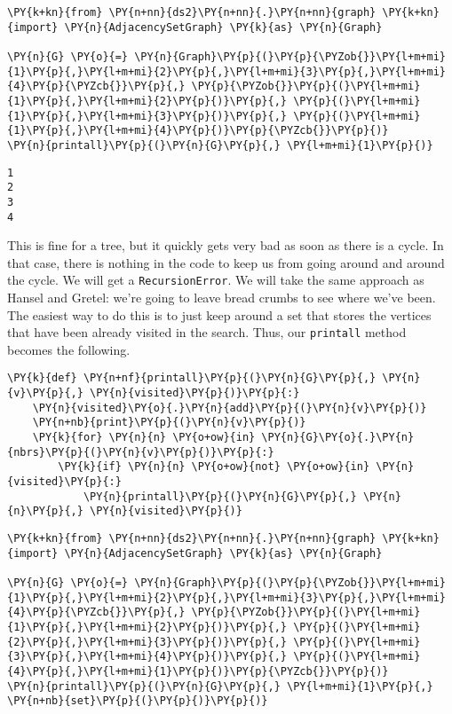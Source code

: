 \begin{Verbatim}[commandchars=\\\{\}]
\PY{k+kn}{from} \PY{n+nn}{ds2}\PY{n+nn}{.}\PY{n+nn}{graph} \PY{k+kn}{import} \PY{n}{AdjacencySetGraph} \PY{k}{as} \PY{n}{Graph}

\PY{n}{G} \PY{o}{=} \PY{n}{Graph}\PY{p}{(}\PY{p}{\PYZob{}}\PY{l+m+mi}{1}\PY{p}{,}\PY{l+m+mi}{2}\PY{p}{,}\PY{l+m+mi}{3}\PY{p}{,}\PY{l+m+mi}{4}\PY{p}{\PYZcb{}}\PY{p}{,} \PY{p}{\PYZob{}}\PY{p}{(}\PY{l+m+mi}{1}\PY{p}{,}\PY{l+m+mi}{2}\PY{p}{)}\PY{p}{,} \PY{p}{(}\PY{l+m+mi}{1}\PY{p}{,}\PY{l+m+mi}{3}\PY{p}{)}\PY{p}{,} \PY{p}{(}\PY{l+m+mi}{1}\PY{p}{,}\PY{l+m+mi}{4}\PY{p}{)}\PY{p}{\PYZcb{}}\PY{p}{)}
\PY{n}{printall}\PY{p}{(}\PY{n}{G}\PY{p}{,} \PY{l+m+mi}{1}\PY{p}{)}
\end{Verbatim}

\begin{Verbatim}
1
2
3
4
\end{Verbatim}


This is fine for a tree, but it quickly gets very bad as soon as there is a cycle.
In that case, there is nothing in the code to keep us from going around and around the cycle.
We will get a \texttt{RecursionError}.
We will take the same approach as Hansel and Gretel: we're going to leave bread crumbs to see where we've been.
The easiest way to do this is to just keep around a set that stores the vertices that have been already visited in the search.
Thus, our \texttt{printall} method becomes the following.

\begin{Verbatim}[commandchars=\\\{\}]
\PY{k}{def} \PY{n+nf}{printall}\PY{p}{(}\PY{n}{G}\PY{p}{,} \PY{n}{v}\PY{p}{,} \PY{n}{visited}\PY{p}{)}\PY{p}{:}
    \PY{n}{visited}\PY{o}{.}\PY{n}{add}\PY{p}{(}\PY{n}{v}\PY{p}{)}
    \PY{n+nb}{print}\PY{p}{(}\PY{n}{v}\PY{p}{)}
    \PY{k}{for} \PY{n}{n} \PY{o+ow}{in} \PY{n}{G}\PY{o}{.}\PY{n}{nbrs}\PY{p}{(}\PY{n}{v}\PY{p}{)}\PY{p}{:}
        \PY{k}{if} \PY{n}{n} \PY{o+ow}{not} \PY{o+ow}{in} \PY{n}{visited}\PY{p}{:}
            \PY{n}{printall}\PY{p}{(}\PY{n}{G}\PY{p}{,} \PY{n}{n}\PY{p}{,} \PY{n}{visited}\PY{p}{)}
\end{Verbatim}



\begin{Verbatim}[commandchars=\\\{\}]
\PY{k+kn}{from} \PY{n+nn}{ds2}\PY{n+nn}{.}\PY{n+nn}{graph} \PY{k+kn}{import} \PY{n}{AdjacencySetGraph} \PY{k}{as} \PY{n}{Graph}

\PY{n}{G} \PY{o}{=} \PY{n}{Graph}\PY{p}{(}\PY{p}{\PYZob{}}\PY{l+m+mi}{1}\PY{p}{,}\PY{l+m+mi}{2}\PY{p}{,}\PY{l+m+mi}{3}\PY{p}{,}\PY{l+m+mi}{4}\PY{p}{\PYZcb{}}\PY{p}{,} \PY{p}{\PYZob{}}\PY{p}{(}\PY{l+m+mi}{1}\PY{p}{,}\PY{l+m+mi}{2}\PY{p}{)}\PY{p}{,} \PY{p}{(}\PY{l+m+mi}{2}\PY{p}{,}\PY{l+m+mi}{3}\PY{p}{)}\PY{p}{,} \PY{p}{(}\PY{l+m+mi}{3}\PY{p}{,}\PY{l+m+mi}{4}\PY{p}{)}\PY{p}{,} \PY{p}{(}\PY{l+m+mi}{4}\PY{p}{,}\PY{l+m+mi}{1}\PY{p}{)}\PY{p}{\PYZcb{}}\PY{p}{)}
\PY{n}{printall}\PY{p}{(}\PY{n}{G}\PY{p}{,} \PY{l+m+mi}{1}\PY{p}{,} \PY{n+nb}{set}\PY{p}{(}\PY{p}{)}\PY{p}{)}
\end{Verbatim}

